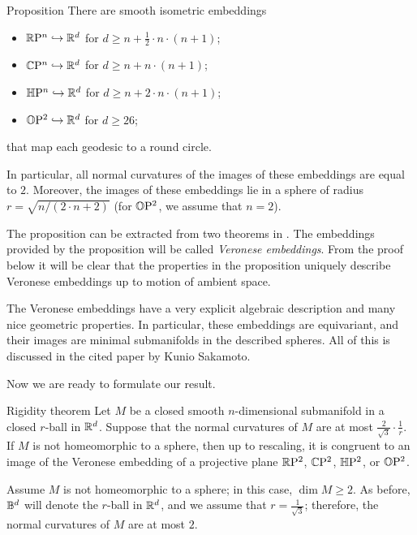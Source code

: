\documentclass[a4paper,10pt]{article}
\begin{document}
\begin{thm}{Proposition}
There are smooth isometric embeddings
\begin{itemize}
 \item $\mathbb{R}\mathrm{P}^n \hookrightarrow\mathbb{R}^d$ for $d\ge n+\tfrac12\cdot n\cdot(n+1)$;
 \item $\mathbb{C}\mathrm{P}^n \hookrightarrow\mathbb{R}^d$ for $d\ge n+n\cdot(n+1)$;
 \item $\mathbb{H}\mathrm{P}^n \hookrightarrow\mathbb{R}^d$ for $d\ge n+2\cdot n\cdot(n+1)$;
 \item $\mathbb{O}\mathrm{P}^2 \hookrightarrow\mathbb{R}^d$ for $d\ge 26$;
\end{itemize}
that map each geodesic to a round circle.

In particular, all normal curvatures of the images of these embeddings are equal to $2$.
Moreover, the images of these embeddings lie in a sphere of radius $r=\sqrt{n/(2\cdot n+2)}$ (for $\mathbb{O}\mathrm{P}^2$, we assume that $n=2$). 
\end{thm}

The proposition can be extracted from two theorems in \cite[§ 2]{sakamoto}.
The embeddings provided by the proposition will be called \emph{Veronese embeddings}.
From the proof below it will be clear that the properties in the proposition uniquely describe
Veronese embeddings up to motion of ambient space.

The Veronese embeddings have a very explicit algebraic description and many nice geometric properties.
In particular,
these embeddings are equivariant, and 
their images are minimal submanifolds in the described spheres.
All of this is discussed in the cited paper by Kunio Sakamoto.
 
Now we are ready to formulate our result.

\begin{thm}{Rigidity theorem}
Let $M$ be a closed smooth $n$-dimensional submanifold in a closed $r$-ball in $\mathbb{R}^d$.
Suppose that the normal curvatures of $M$ are at most $\tfrac2{\sqrt{3}}\cdot\tfrac1r$.
If $M$ is not homeomorphic to a sphere, then up to rescaling, it is congruent to an image of the Veronese embedding of a projective plane $\mathbb{R}\mathrm{P}^2$, $\mathbb{C}\mathrm{P}^2$, $\mathbb{H}\mathrm{P}^2$, or $\mathbb{O}\mathrm{P}^2$.
\end{thm}

Assume $M$ is not homeomorphic to a sphere;
in this case, $\dim M\ge 2$.
As before, $\mathbb{B}^d$ will denote the $r$-ball in $\mathbb{R}^d$, and we assume that $r=\tfrac1{\sqrt{3}}$;
therefore, the normal curvatures of $M$ are at most $2$.
\end{document}
